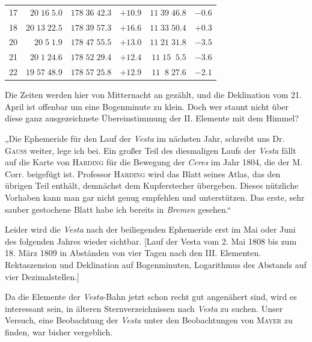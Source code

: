 \begin{center}
\begin{tabular}{lrrrrr}
17 & $20\;16\;5.0$ & $178\;36\;42.3$ & $+10.9$ & $11\;39\;46.8$ & $-0.6$ \\
18 & $20\;13\;22.5$ & $178\;39\;57.3$ & $+16.6$ & $11\;33\;50.4$ & $+0.3$ \\
20 & $20\;5\;1.9$ & $178\;47\;55.5$ & $+13.0$ & $11\;21\;31.8$ & $-3.5$ \\
21 & $20\;1\;24.6$ & $178\;52\;29.4$ & $+12.4$ & $11\;15\;\;5.5$ & $-3.6$ \\
22 & $19\;57\;48.9$ & $178\;57\;25.8$ & $+12.9$ & $11\;\;8\;27.6$ & $-2.1$ \\
\end{tabular}\end{center}\endgroup


\par\indent Die Zeiten werden hier von Mitternacht an gezählt, und die Deklination vom 21. April ist offenbar um eine Bogenminute zu klein. Doch wer staunt nicht über diese ganz ausgezeichnete Übereinstimmung der II. Elemente mit dem Himmel?

\par\indent „Die Ephemeride für den Lauf der \emph{Vesta} im nächsten Jahr, schreibt uns Dr. \textsc{Gauss} weiter, lege ich bei. Ein großer Teil des diesmaligen Laufs der \emph{Vesta} fällt auf die Karte von \textsc{Harding} für die Bewegung der \emph{Ceres} im Jahr 1804, die der M. Corr. beigefügt ist. Professor \textsc{Harding} wird das Blatt seines Atlas, das den übrigen Teil enthält, demnächst dem Kupferstecher übergeben. Dieses nützliche Vorhaben kann man gar nicht genug empfehlen und unterstützen. Das erste, sehr sauber gestochene Blatt habe ich bereits in \emph{Bremen} gesehen.“

\par\indent Leider wird die \emph{Vesta} nach der beiliegenden Ephemeride erst im Mai oder Juni des folgenden Jahres wieder sichtbar. [Lauf der Vesta vom 2. Mai 1808 bis zum 18. März 1809 in Abständen von vier Tagen nach den III. Elementen. Rektaszension und Deklination auf Bogenminuten, Logarithmus des Abstands auf vier Dezimalstellen.]

\par\indent Da die Elemente der \emph{Vesta}-Bahn jetzt schon recht gut angenähert sind, wird es interessant sein, in älteren Sternverzeichnissen nach \emph{Vesta} zu suchen. Unser Versuch, eine Beobachtung der \emph{Vesta} unter den Beobachtungen von \textsc{Mayer} zu finden, war bisher vergeblich.

\begin{flushright}
\end{flushright}

